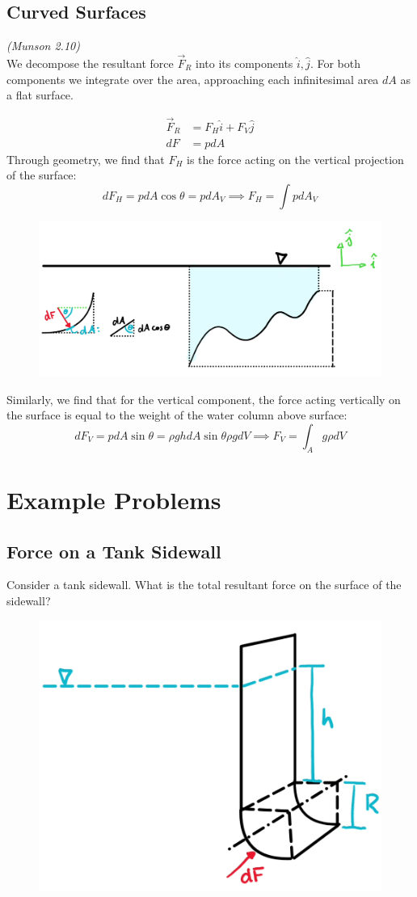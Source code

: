 \subsection{Curved Surfaces}
\textit{(Munson 2.10)}\hfill\\

We decompose the resultant force $\vec F_R$ into its components $\hat i, \hat j$. For both components we integrate over the area, approaching each infinitesimal area $dA$ as a flat surface.

\begin{equation*}
	\begin{split}
		\vec F_R &= F_H\hat i + F_V \hat j\\
		dF &= pdA
	\end{split}
\end{equation*}
Through geometry, we find that $F_H$ is the force acting on the vertical projection of the surface:
\begin{equation*}
	dF_H = pdA\cos\theta = pdA_V\implies F_H=\int pdA_V
\end{equation*}
\begin{figure}[H]
	\centering
	\includegraphics[width=0.7\linewidth]{Sketches/ForceOnCurvedSurface}
	\label{fig:forceoncurvedsurface}
\end{figure}

Similarly, we find that for the vertical component, the force acting vertically on the surface is equal to the weight of the water column above surface:
\begin{equation*}
	dF_V=pdA\sin\theta = \rho ghdA\sin\theta \rho g dV \implies F_V = \int_A g\rho dV 
\end{equation*}


\section{Example Problems}
\subsection{Force on a Tank Sidewall}
Consider a tank sidewall. What is the total resultant force on the surface of the sidewall?
\begin{figure}[H]
	\centering
	\includegraphics[width=0.4\linewidth]{Sketches/ExampleTankSidewall}
\end{figure}

